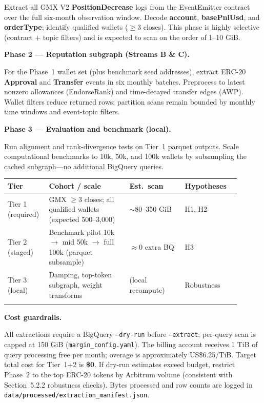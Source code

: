 Extract all GMX V2 \textbf{PositionDecrease} logs from the EventEmitter contract over the full six-month observation window. Decode \textbf{account}, \textbf{basePnlUsd}, and \textbf{orderType}; identify qualified wallets ($\geq 3$ closes). This phase is highly selective (contract + topic filters) and is expected to scan on the order of 1--10 GiB.


\textbf{Phase 2 --- Reputation subgraph (Streams B \& C).}


For the Phase~1 wallet set (plus benchmark seed addresses), extract ERC-20 \textbf{Approval} and \textbf{Transfer} events in six monthly batches. Preprocess to latest nonzero allowances (EndorseRank) and time-decayed transfer edges (AWP). Wallet filters reduce returned rows; partition scans remain bounded by monthly time windows and event-topic filters.


\textbf{Phase 3 --- Evaluation and benchmark (local).}


Run alignment and rank-divergence tests on Tier~1 parquet outputs. Scale computational benchmarks to 10k, 50k, and 100k wallets by subsampling the cached subgraph---no additional BigQuery queries.


\begin{longtable}{>{\raggedright\arraybackslash}p{0.14\linewidth}>{\raggedright\arraybackslash}p{0.32\linewidth}>{\raggedright\arraybackslash}p{0.22\linewidth}>{\raggedright\arraybackslash}p{0.22\linewidth}}
\toprule
\textbf{Tier} & \textbf{Cohort / scale} & \textbf{Est.\ scan} & \textbf{Hypotheses} \\
\midrule
Tier 1 (required) & GMX $\geq 3$ closes; all qualified wallets (expected 500--3,000) & $\sim$80--350 GiB & H1, H2 \\
Tier 2 (staged) & Benchmark pilot 10k $\to$ mid 50k $\to$ full 100k (parquet subsample) & $\approx 0$ extra BQ & H3 \\
Tier 3 (local) & Damping, top-token subgraph, weight transforms & 0 (local recompute) & Robustness \\
\addlinespace
\bottomrule
\end{longtable}


\textbf{Cost guardrails.}


All extractions require a BigQuery \texttt{--dry-run} before \texttt{--extract}; per-query scan is capped at 150 GiB (\texttt{margin\_config.yaml}). The billing account receives 1 TiB of query processing free per month; overage is approximately US\$6.25/TiB. Target total cost for Tier~1+2 is \textbf{\$0}. If dry-run estimates exceed budget, restrict Phase~2 to the top ERC-20 tokens by Arbitrum volume (consistent with Section~5.2.2 robustness checks). Bytes processed and row counts are logged in \texttt{data/processed/extraction\_manifest.json}.


